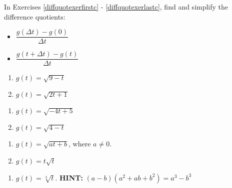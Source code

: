 In Exercises \ref{diffquotexerfirstc} - \ref{diffquotexerlastc}, find and simplify the difference quotients:

\begin{multicols}{2}

\begin{itemize}

\item  $\dfrac{g(\Delta t) - g(0)}{\Delta t}$

\item  $\dfrac{g(t+\Delta t) - g(t)}{\Delta t}$

\end{itemize}

\end{multicols}


\begin{multicols}{2}
\begin{enumerate}
\setcounter{enumi}{\value{HW}}

\item  $g(t) = \sqrt{9-t}$  \label{diffquotexerfirstc}
\item  $g(t) = \sqrt{2t+1}$

\setcounter{HW}{\value{enumi}}
\end{enumerate}
\end{multicols}

\begin{multicols}{2}
\begin{enumerate}
\setcounter{enumi}{\value{HW}}

\item  $g(t) = \sqrt{-4t+5}$
\item  $g(t) = \sqrt{4-t}$

\setcounter{HW}{\value{enumi}}
\end{enumerate}
\end{multicols}

\begin{multicols}{2}
\begin{enumerate}
\setcounter{enumi}{\value{HW}}

\item  $g(t) = \sqrt{at+b}$, where $a \neq 0$.
\item  $g(t) = t \sqrt{t}$ 

\setcounter{HW}{\value{enumi}}
\end{enumerate}
\end{multicols}

\begin{enumerate}
\setcounter{enumi}{\value{HW}}

\item  $g(t) = \sqrt[3]{t}$.  \textbf{HINT:}  $(a-b)\left(a^2+ab+b^2\right) = a^3 - b^3$  \label{diffquotexerlastc}
\setcounter{HW}{\value{enumi}}
\end{enumerate}


